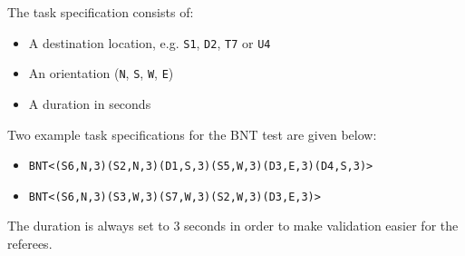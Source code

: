 The task specification consists of:

\begin{itemize}
	\item A destination location, e.g. \texttt{S1}, \texttt{D2}, \texttt{T7} or \texttt{U4}
	\item An orientation (\texttt{N}, \texttt{S}, \texttt{W}, \texttt{E})
	\item A duration in seconds
\end{itemize}


Two example task specifications for the BNT test are given below:

\begin{itemize}
	\item \texttt{BNT\textless(S6,N,3)(S2,N,3)(D1,S,3)(S5,W,3)(D3,E,3)(D4,S,3)\textgreater}
	\item \texttt{BNT\textless(S6,N,3)(S3,W,3)(S7,W,3)(S2,W,3)(D3,E,3)\textgreater}
\end{itemize}

The duration is always set to 3 seconds in order to make validation easier for the referees.
%
%
%
%
%
%
%
%
%
